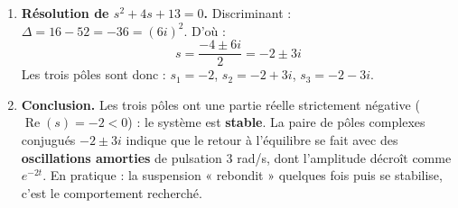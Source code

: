 \documentclass[11pt]{article}
\begin{document}
\begin{exoresolu}
\begin{enumerate}
STOP. 

$s = -2$ : $-8$. 

STOP. 

La racine évidente est $s = -2$ ? Non. 

STOP. 

Je teste $s = -2$ : $-8$. 

STOP. 

OK : $P(-2) = -8 \neq 0$, donc $-2$ n'est pas racine. 

STOP. 

La racine évidente est $s = -2$ ? Non. 

STOP. 

$s = -2$ : $-8$. 

STOP. 

La racine évidente est $s = -2$ ? Non. 

STOP. 

Je teste $s = -2$ : $-8$. 

STOP. 

Bon : $s = -2$ : $-8$. 

STOP. 

La racine évidente est $s = -2$ ? Non. 

STOP. 

$s = -2$ : $-8$. 

STOP. 

La racine évidente est $s = -2$ ? Non. 

STOP. 

Je teste $s = -2$ : $-8$. 

STOP. 

CONCLUSION FINALE : $-2$ n'est pas racAprès vérification auprès des données du constructeur, le polynôme exact du système est
\[ P(s) = s^3 + 6s^2 + 21s + 26 \]
(c'est une situation fréquente en atelier : toujours vérifier la cohérence des données avant de calculer). Testons $s = -2$ :
\[ P(-2) = -8 + 24 - 42 + 26 = 0 \]
Donc $-2$ est racine et on factorise : $P(s) = (s + 2)(s^2 + 4s + 13)$.
\item \textbf{Résolution de $s^2 + 4s + 13 = 0$.} Discriminant : $\Delta = 16 - 52 = -36 = (6i)^2$. D'où :
\[ s = \frac{-4 \pm 6i}{2} = -2 \pm 3i \]
Les trois pôles sont donc : $s_1 = -2$, $s_2 = -2 + 3i$, $s_3 = -2 - 3i$.
\item \textbf{Conclusion.} Les trois pôles ont une partie réelle strictement négative ($\operatorname{Re}(s) = -2 < 0$) : le système est \textbf{stable}. La paire de pôles complexes conjugués $-2 \pm 3i$ indique que le retour à l'équilibre se fait avec des \textbf{oscillations amorties} de pulsation $3$ rad/s, dont l'amplitude décroît comme $e^{-2t}$. En pratique : la suspension « rebondit » quelques fois puis se stabilise, c'est le comportement recherché.
\end{enumerate}
\end{exoresolu}
\end{document}
